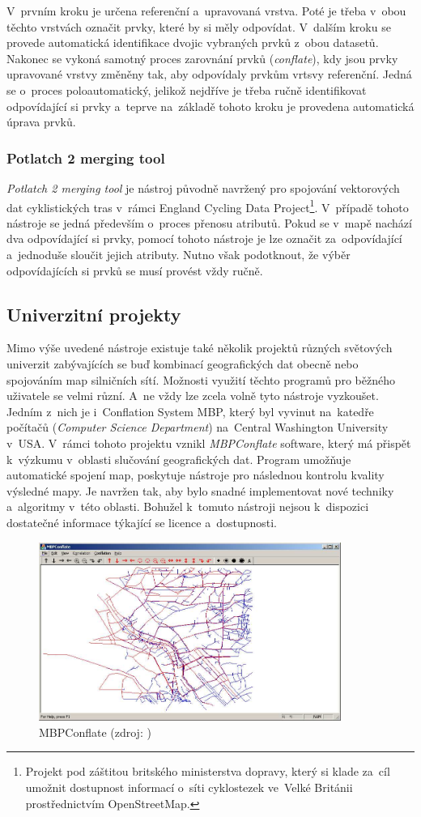 V~prvním kroku je určena referenční a~upravovaná vrstva. Poté je třeba v~obou
těchto vrstvách označit prvky, které by si měly odpovídat. V~dalším kroku se 
provede automatická identifikace dvojic vybraných prvků z~obou datasetů. 
Nakonec se vykoná samotný proces zarovnání prvků (\textit{conflate}), kdy 
jsou prvky upravované vrstvy změněny tak, aby odpovídaly prvkům vrtsvy 
referenční. Jedná se o~proces poloautomatický, jelikož nejdříve je třeba
ručně identifikovat odpovídající si prvky a~teprve na~základě tohoto kroku je 
provedena automatická úprava prvků.

\subsubsection{Potlatch 2 merging tool}

\textit{Potlatch 2 merging tool} je nástroj původně navržený pro spojování 
vektorových dat cyklistických tras v~rámci England Cycling Data 
Project\footnote{Projekt pod záštitou britského ministerstva dopravy, 
který si klade za~cíl umožnit dostupnost informací o~síti cyklostezek
ve~Velké Británii prostřednictvím OpenStreetMap.}. 
V~případě tohoto nástroje se jedná především o~proces přenosu atributů. 
Pokud se v~mapě nachází dva odpovídající si prvky, pomocí tohoto nástroje je 
lze označit za~odpovídající a~jednoduše sloučit jejich atributy. Nutno 
však podotknout, že výběr odpovídajících si prvků se musí provést vždy ručně. 


\subsection{Univerzitní projekty}
\label{univerzitní}

Mimo výše uvedené nástroje existuje také několik projektů různých světových
univerzit zabývajících se buď kombinací geo\-grafických dat obecně nebo 
spojováním map silničních sítí. Možnosti využití těchto programů pro běžného
uživatele se velmi různí. A~ne vždy lze zcela volně tyto nástroje vyzkoušet. 
Jedním z~nich je i~Conflation System MBP, který byl vyvinut na~katedře počítačů 
(\textit{Computer Science Department}) na~Central Washington University v~USA. 
V~rámci tohoto projektu vznikl \textit{MBPConflate} software, který má přispět 
k~výzkumu v~oblasti slučování geo\-grafických dat. Program umožňuje automatické 
spojení map, poskytuje nástroje pro následnou kontrolu kvali\-ty výsledné mapy. 
Je navržen tak, aby bylo snadné implementovat nové techniky a~algoritmy v~této 
oblasti. Bohužel k~tomuto nástroji nejsou k~dispozici dostatečné informace týkající
se licence a~dostupnosti. 

   \begin{figure}[hbt]
     \centering
       \includegraphics[width=280pt]{./pictures/MBPconflate.png}
       \caption[MBPConflate]{MBPConflate (zdroj: \cite{mbp})}
       \label{fig:mbp}
   \end{figure}
